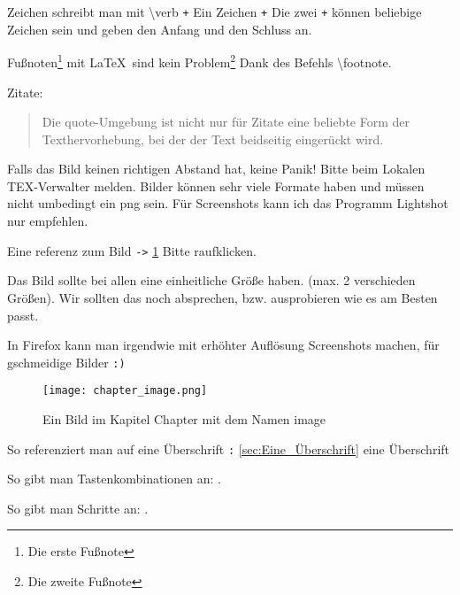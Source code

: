 Zeichen schreibt man mit \textbackslash verb \verb-+- Ein Zeichen \verb-+- Die zwei \verb-+- können
beliebige Zeichen sein und geben den Anfang und den Schluss an.

Fußnoten\footnote{Die erste Fußnote} mit \LaTeX\ sind kein Problem\footnote{Die zweite Fußnote} Dank des Befehls \textbackslash footnote.

Zitate:

\begin{quote}
    Die quote-Umgebung ist nicht nur für Zitate eine beliebte Form
    der Texthervorhebung, bei der der Text beidseitig eingerückt wird.
\end{quote}


Falls das Bild keinen richtigen Abstand hat, keine Panik! Bitte beim Lokalen TEX-Verwalter melden.
Bilder können sehr viele Formate haben und müssen nicht umbedingt ein png sein.
Für Screenshots kann ich das Programm Lightshot nur empfehlen.

Eine referenz zum Bild \verb+->+ \ref{chapter:image} Bitte raufklicken.

Das Bild sollte bei allen eine einheitliche Größe haben. (max. 2 verschieden Größen). Wir sollten das noch absprechen,
bzw. ausprobieren wie es am Besten passt.

In Firefox kann man irgendwie mit erhöhter Auflösung Screenshots machen, für gschmeidige Bilder \verb-:)-

\begin{figure}[h]
    \centering
    \texttt{[image: chapter\_image.png]}
    \caption{Ein Bild im Kapitel Chapter mit dem Namen image}
    \label{chapter:image}
\end{figure}

So referenziert man auf eine Überschrift \verb-:- \autoref{sec:Eine_Überschrift} eine Überschrift

So gibt man Tastenkombinationen an: .

So gibt man Schritte an: .
